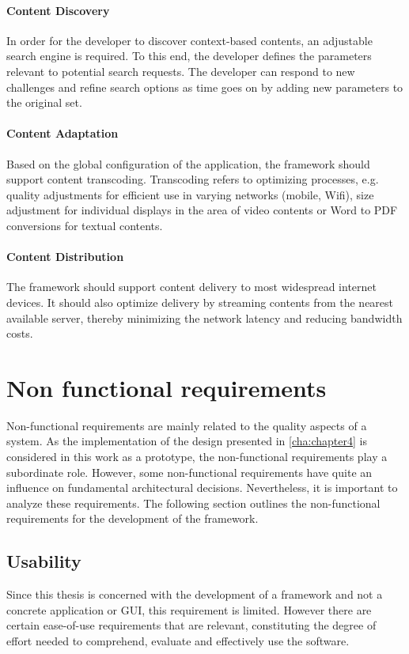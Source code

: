 \paragraph{Content Discovery}
In order for the developer to discover context-based contents, an adjustable search engine is required. To this end, the developer defines the parameters relevant to potential search requests. The developer can respond to new challenges and refine search options as time goes on by adding new parameters to the original set.      

\paragraph{Content Adaptation}
Based on the global configuration of the application, the framework should support content transcoding. Transcoding refers to optimizing processes, e.g. quality adjustments for efficient use in varying networks (mobile, Wifi), size adjustment for individual displays in the area of video contents or Word to PDF conversions for textual contents.
  
\paragraph{Content Distribution}
The framework should support content delivery to most widespread internet devices. It should also optimize delivery by streaming contents from the nearest available server, thereby minimizing the network latency and reducing bandwidth costs.   

\section{Non functional requirements\label{sec:req_nf_req}}
Non-functional requirements are mainly related to the quality aspects of a system. As the implementation of the design presented in \ref{cha:chapter4} is considered in this work as a prototype, the non-functional requirements play a subordinate role. However, some non-functional requirements have quite an influence on fundamental architectural decisions. Nevertheless, it is important to analyze these requirements. The following section outlines the non-functional requirements for the development of the framework.

\subsection{Usability}
Since this thesis is concerned with the development of a framework and not a concrete application or \ac{GUI}, this requirement is limited. However there are certain ease-of-use requirements  that are relevant, constituting the degree of effort needed to comprehend, evaluate and effectively use the software.  


